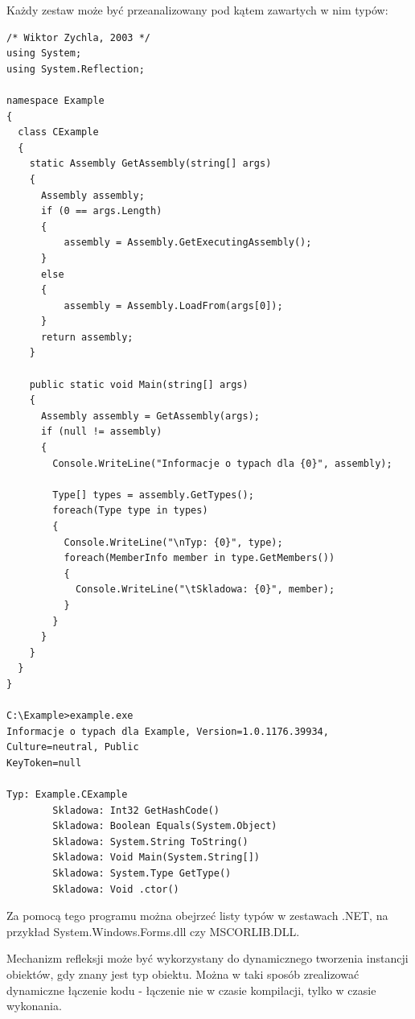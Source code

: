 Każdy zestaw może być przeanalizowany pod kątem zawartych w nim typów:

\begin{scriptsize}
\begin{verbatim}
/* Wiktor Zychla, 2003 */
using System;
using System.Reflection;

namespace Example
{	  
  class CExample
  {  	
    static Assembly GetAssembly(string[] args)
    {
      Assembly assembly;
      if (0 == args.Length)
      {
          assembly = Assembly.GetExecutingAssembly();
      }
      else
      {
          assembly = Assembly.LoadFrom(args[0]);
      }
      return assembly;
    }

    public static void Main(string[] args)
    {
      Assembly assembly = GetAssembly(args);
      if (null != assembly)
      {
        Console.WriteLine("Informacje o typach dla {0}", assembly);

        Type[] types = assembly.GetTypes();
        foreach(Type type in types)
        {
          Console.WriteLine("\nTyp: {0}", type);
          foreach(MemberInfo member in type.GetMembers())
          {
            Console.WriteLine("\tSkladowa: {0}", member);
          }
        }
      }      
    }
  }
}

C:\Example>example.exe
Informacje o typach dla Example, Version=1.0.1176.39934, Culture=neutral, Public
KeyToken=null

Typ: Example.CExample
        Skladowa: Int32 GetHashCode()
        Skladowa: Boolean Equals(System.Object)
        Skladowa: System.String ToString()
        Skladowa: Void Main(System.String[])
        Skladowa: System.Type GetType()
        Skladowa: Void .ctor()
\end{verbatim}
\end{scriptsize}

Za pomocą tego programu można obejrzeć listy typów w zestawach .NET, na przykład System.Windows.Forms.dll
czy MSCORLIB.DLL.

Mechanizm refleksji może być wykorzystany do dynamicznego tworzenia instancji obiektów, 
gdy znany jest typ obiektu. Można w taki sposób zrealizować dynamiczne łączenie
kodu - łączenie nie w czasie kompilacji, tylko w czasie wykonania.

